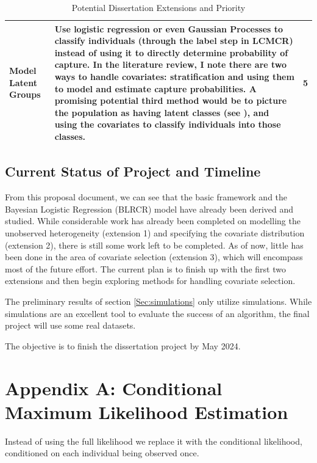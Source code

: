 \documentclass[
  12pt,
]{article}
\begin{document}
\begin{table}[H]
\begin{tabular}{||p{3cm}||p{10cm}|p{1.2cm}||}
 \hline
 Model Latent Groups & Use logistic regression or even Gaussian Processes to classify individuals (through the label step in LCMCR) instead of using it to directly determine probability of capture. In the literature review, I note there are two ways to handle covariates: stratification and using them to model and estimate capture probabilities. A promising potential third method would be to picture the population as having latent classes (see \cite{manriquevallier_bayesian_2016}), and using the covariates to classify individuals into those classes.&  5  \\
 \hline
\end{tabular}
\caption{Potential Dissertation Extensions and Priority}
\label{table:timelinetable}
\end{table}

\subsection{Current Status of Project and Timeline}

From this proposal document, we can see that the basic framework and the
Bayesian Logistic Regression (BLRCR) model have already been derived and
studied. While considerable work has already been completed on modelling
the unobserved heterogeneity (extension 1) and specifying the covariate
distribution (extension 2), there is still some work left to be
completed. As of now, little has been done in the area of covariate
selection (extension 3), which will encompass most of the future effort.
The current plan is to finish up with the first two extensions and then
begin exploring methods for handling covariate selection.

The preliminary results of section \ref{Sec:simulations} only utilize
simulations. While simulations are an excellent tool to evaluate the
success of an algorithm, the final project will use some real datasets.

The objective is to finish the dissertation project by May 2024.

\newpage

\section{Appendix A: Conditional Maximum Likelihood Estimation}

\label{Sec:conditionalmaximumlike}

Instead of using the full likelihood we replace it with the conditional
likelihood, conditioned on each individual being observed once.
\end{document}
